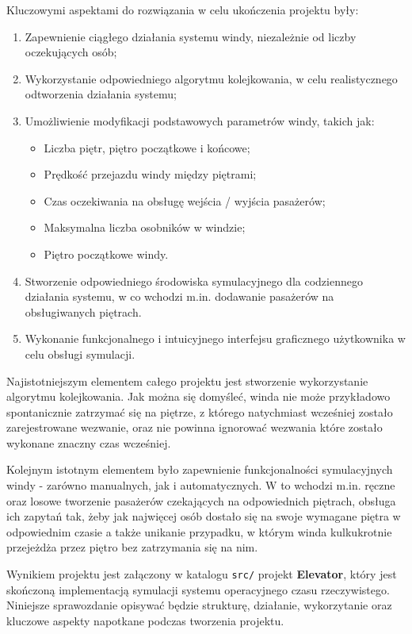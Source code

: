 \documentclass[12pt, a4paper]{article}
\begin{document}
Kluczowymi aspektami do rozwiązania w celu ukończenia projektu były:
\begin{enumerate}
    \item Zapewnienie ciągłego działania systemu windy, niezależnie od liczby oczekujących osób;
    \item Wykorzystanie odpowiedniego algorytmu kolejkowania, w celu realistycznego odtworzenia działania systemu;
    \item Umożliwienie modyfikacji podstawowych parametrów windy, takich jak:
    \begin{itemize}
        \item Liczba piętr, piętro początkowe i końcowe;
        \item Prędkość przejazdu windy między piętrami;
        \item Czas oczekiwania na obsługę wejścia / wyjścia pasażerów;
        \item Maksymalna liczba osobników w windzie;
        \item Piętro początkowe windy.
    \end{itemize}
    \item Stworzenie odpowiedniego środowiska symulacyjnego dla codziennego działania systemu, w co wchodzi m.in. dodawanie 
            pasażerów na obsługiwanych piętrach.
    \item Wykonanie funkcjonalnego i intuicyjnego interfejsu graficznego użytkownika w celu obsługi symulacji.
\end{enumerate}

Najistotniejszym elementem całego projektu jest stworzenie wykorzystanie algorytmu kolejkowania. Jak można się domyśleć, 
winda nie może przykładowo spontanicznie zatrzymać się na piętrze, z którego natychmiast wcześniej zostało zarejestrowane wezwanie,
oraz nie powinna ignorować wezwania które zostało wykonane znaczny czas wcześniej. 

Kolejnym istotnym elementem było zapewnienie funkcjonalności symulacyjnych windy - zarówno manualnych, jak i automatycznych. 
W to wchodzi m.in. ręczne oraz losowe tworzenie pasażerów czekających na odpowiednich piętrach, obsługa ich zapytań tak, żeby jak
najwięcej osób dostało się na swoje wymagane piętra w odpowiednim czasie a także unikanie przypadku, w którym winda kulkukrotnie 
przejeżdża przez piętro bez zatrzymania się na nim.

Wynikiem projektu jest załączony w katalogu \texttt{src/} projekt \textbf{Elevator}, który jest skończoną implementacją symulacji
systemu operacyjnego czasu rzeczywistego. Niniejsze sprawozdanie opisywać będzie strukturę, działanie, wykorzytanie oraz 
kluczowe aspekty napotkane podczas tworzenia projektu.
\end{document}
